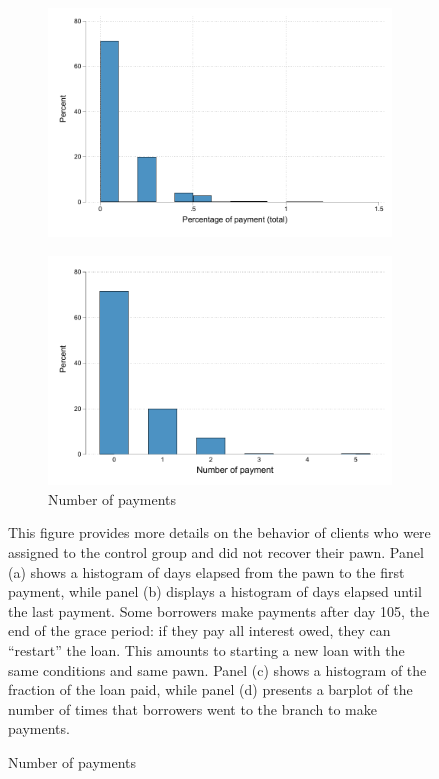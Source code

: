 \begin{figure}[H]
\begin{center}
\begin{subfigure}{0.40\textwidth}
        \includegraphics[width=\textwidth]{Figuras/hist_percpay_default.pdf}
    \end{subfigure}
    \begin{subfigure}{0.40\textwidth}
        \caption{Number of payments}
        \centering
        \includegraphics[width=\textwidth]{Figuras/hist_numpay_default.pdf}
    \end{subfigure}
    \end{center}
        \scriptsize 
        This figure provides more details on the behavior of clients who were assigned to the control group and did not recover their pawn. Panel (a) shows a histogram of days elapsed from the pawn to the first payment, while panel (b) displays a histogram of days elapsed until the last payment. Some borrowers make payments after day 105, the end of the grace period: if they pay all interest owed, they can ``restart'' the loan. This amounts to starting a new loan with the same conditions and same pawn. Panel (c) shows a histogram of the fraction of the loan paid, while panel (d) presents a barplot of the number of times that borrowers went to the branch to make payments.
\end{figure}




